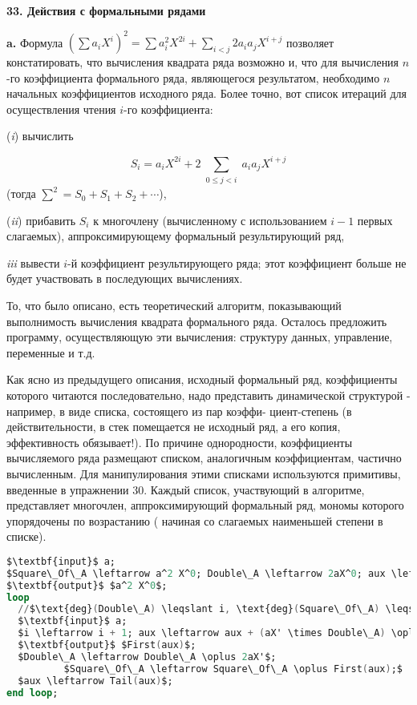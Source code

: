 \noindent\textbf{33. Действия с формальными рядами}\newline

\textbf{a.} Формула $(\sum a_iX^i)^2 = \sum a_i^2 X^{2i} + \sum_{i < j}2a_i a_j X^{i+j}$ позволяет констатировать,
что вычисления квадрата ряда возможно и, что для вычисления $n$-го коэффициента
формального ряда, являющегося результатом, необходимо $n$ начальных коэффициентов исходного ряда. Более точно, вот список итераций для осуществления чтения $i$-го коэффициента:

(\textit{i}) вычислить

\begin{equation*}
S_i = a_i X^{2i} + 2 \sum_{\substack{0 \leqslant j < i}} a_i a_j X^{i+j}
\end{equation*}
(тогда $\sum^2 = S_0 + S_1 + S_2 + \cdots$),

(\textit{ii}) прибавить $S_i$ к многочлену (вычисленному с использованием $i - 1$ первых слагаемых),
аппроксимирующему формальный результирующий ряд,

\textit{iii} вывести $i$-й коэффициент результирующего ряда; этот коэффициент
больше не будет участвовать в последующих вычислениях.

То, что было описано, есть теоретический алгоритм, показывающий выполнимость
вычисления квадрата формального ряда. Осталось предложить программу,
осуществляющую эти вычисления: структуру данных, управление, переменные и т.д.

Как ясно из предыдущего описания, исходный формальный ряд, коэффициенты которого
читаются последовательно, надо представить динамической структурой - например,
в виде списка, состоящего из пар коэффи- \linebreak циент-степень (в действительности,
в стек помещается не исходный ряд, а его копия, эффективность обязывает!).
По причине однородности, коэффициенты вычисляемого ряда размещают списком,
аналогичным коэффициентам, частично вычисленным. Для манипулирования этими
списками используются примитивы, введенные в упражнении 30. Каждый список,
участвующий в алгоритме, представляет многочлен, аппроксимирующий формальный ряд, мономы которого
упорядочены по возрастанию ( начиная со слагаемых наименьшей степени в списке).
\newpage

\begin{lstlisting}[mathescape=true, caption=Квадрат формального ряда, language=Ada]
$\textbf{input}$ a;
$Square\_Of\_A \leftarrow a^2 X^0; Double\_A \leftarrow 2aX^0; aux \leftarrow 0; i \leftarrow 0;$
$\textbf{output}$ $a^2 X^0$;
loop
  //$\text{deg}(Double\_A) \leqslant i, \text{deg}(Square\_Of\_A) \leqslant i, \text{deg}(aux) \leqslant 2i, \text{ord}(aux) \geqslant i$
  $\textbf{input}$ a;
  $i \leftarrow i + 1; aux \leftarrow aux + (aX' \times Double\_A) \oplus a^2 X^{2i}$;
  $\textbf{output}$ $First(aux)$;
  $Double\_A \leftarrow Double\_A \oplus 2aX'$;
          $Square\_Of\_A \leftarrow Square\_Of\_A \oplus First(aux);$
  $aux \leftarrow Tail(aux)$;
end loop;
\end{lstlisting}

